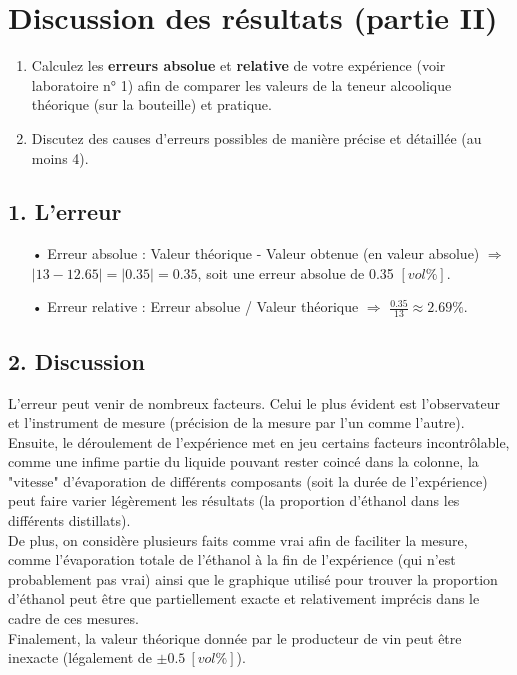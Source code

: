 \documentclass[11pt]{article}
\begin{document}
\section*{Discussion des résultats (partie II)}
\begin{enumerate}
\item Calculez  les  \textbf{erreurs  absolue} et \textbf{relative}  de  votre  expérience  (voir  laboratoire  n°  1)  afin  de comparer les valeurs de la teneur alcoolique  théorique (sur la bouteille) et pratique.
\item Discutez des causes d'erreurs possibles de manière précise et détaillée (au moins 4).
\end{enumerate}
\subsection*{1. L'erreur}
\begin{itemize}
\item[•]Erreur absolue : Valeur théorique - Valeur obtenue (en valeur absolue) $\Rightarrow$ $\lvert 13 - 12.65 \rvert = \lvert 0.35 \rvert = 0.35$, soit une erreur absolue de 0.35 $[vol \%]$.
\item[•] Erreur relative : Erreur absolue / Valeur théorique $\Rightarrow$ $\frac{0.35}{13} \approx 2.69 \%$.
\end{itemize}

\subsection*{2. Discussion}
L'erreur peut venir de nombreux facteurs. Celui le plus évident est l'observateur et l'instrument de mesure (précision de la mesure par l'un comme l'autre). \\
Ensuite, le déroulement de l'expérience met en jeu certains facteurs incontrôlable, comme une infime partie du liquide pouvant rester coincé dans la colonne, la "vitesse" d'évaporation de différents composants (soit la durée de l'expérience) peut faire varier légèrement les résultats (la proportion d'éthanol dans les différents distillats). \\
De plus, on considère plusieurs faits comme vrai afin de faciliter la mesure, comme l'évaporation totale de l'éthanol à la fin de l'expérience (qui n'est probablement pas vrai) ainsi que le graphique utilisé pour trouver la proportion d'éthanol peut être que partiellement exacte et relativement imprécis dans le cadre de ces mesures.\\
 Finalement, la valeur théorique donnée par le producteur de vin peut être inexacte (légalement de $\pm 0.5 \: [vol \%]$).
\end{document}
